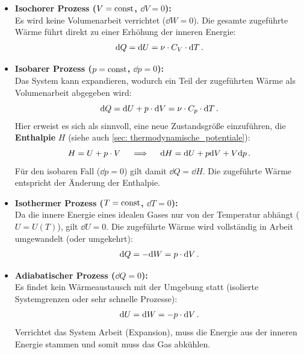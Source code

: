 \begin{itemize}
    \item \textbf{Isochorer Prozess ($V = \mathrm{const}$, $\dd V=0$):}\\
    Es wird keine Volumenarbeit verrichtet ($\dd W=0$). Die gesamte zugeführte Wärme führt direkt zu einer Erhöhung der inneren Energie:
    \begin{equation}
        \mathrm{d} Q = \mathrm{d} U = \nu \cdot C_V \cdot \mathrm{d} T \,.
    \end{equation}

    \item \textbf{Isobarer Prozess ($p = \mathrm{const}$, $\dd p=0$):}\\
    Das System kann expandieren, wodurch ein Teil der zugeführten Wärme als Volumenarbeit abgegeben wird:
    \begin{equation}
        \mathrm{d} Q = \mathrm{d} U + p \cdot \mathrm{d} V = \nu \cdot C_p \cdot \mathrm{d} T \,.
    \end{equation}
    Hier erweist es sich als sinnvoll, eine neue Zustandsgröße einzuführen, die \textbf{Enthalpie} $H$ (siehe auch \cref{sec: thermodynamische_potentiale}):
    \begin{equation}
        H = U + p \cdot V \quad \implies \quad \mathrm{d} H = \mathrm{d} U + p\mathrm{d} V + V\mathrm{d} p \,.
    \end{equation}
    Für den isobaren Fall ($\dd p = 0$) gilt damit $\dd Q = \dd H$. Die zugeführte Wärme entspricht der Änderung der Enthalpie.
    
    \item \textbf{Isothermer Prozess ($T = \mathrm{const}$, $\dd T=0$):}\\
    Da die innere Energie eines idealen Gases nur von der Temperatur abhängt ($U=U(T)$), gilt $\dd U=0$. Die zugeführte Wärme wird vollständig in Arbeit umgewandelt (oder umgekehrt):
    \begin{equation}
        \mathrm{d} Q = -\mathrm{d} W = p \cdot \mathrm{d} V \,.
    \end{equation}

    \item \textbf{Adiabatischer Prozess ($\dd Q = 0$):}\\
    Es findet kein Wärmeaustausch mit der Umgebung statt (isolierte Systemgrenzen oder sehr schnelle Prozesse):
    \begin{equation}
        \mathrm{d} U = \mathrm{d} W = -p \cdot \mathrm{d} V \,.
    \end{equation}
    Verrichtet das System Arbeit (Expansion), muss die Energie aus der inneren Energie stammen und somit muss das Gas abkühlen.
\end{itemize}


